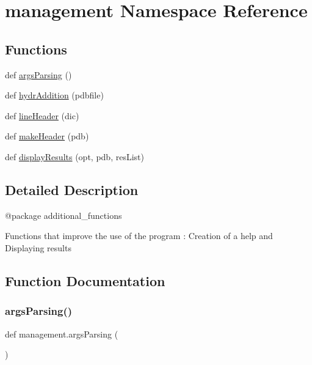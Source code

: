 \hypertarget{namespacemanagement}{}\section{management Namespace Reference}
\label{namespacemanagement}
\subsection*{Functions}
\begin{DoxyCompactItemize}
\item 
def \hyperlink{namespacemanagement_a21eb9ebc249ee7044c7d7b928fa4c848}{args\+Parsing} ()
\item 
def \hyperlink{namespacemanagement_a1b38488abcc92ed2c32b1fa6fd12632d}{hydr\+Addition} (pdbfile)
\item 
def \hyperlink{namespacemanagement_acdaa6894354bf7d216a7b171b7abde78}{line\+Header} (dic)
\item 
def \hyperlink{namespacemanagement_ab684f6dcec493b3604c10971f42a104d}{make\+Header} (pdb)
\item 
def \hyperlink{namespacemanagement_afd826b0a557021cd5bfde6f85b453e8b}{display\+Results} (opt, pdb, res\+List)
\end{DoxyCompactItemize}


\subsection{Detailed Description}
\begin{DoxyVerb}@package additional_functions

Functions that improve the use of the program :
Creation of a help and Displaying results
\end{DoxyVerb}
 

\subsection{Function Documentation}
\mbox{\label{namespacemanagement_a21eb9ebc249ee7044c7d7b928fa4c848}} 
\subsubsection{\texorpdfstring{args\+Parsing()}{argsParsing()}}
{\footnotesize\ttfamily def management.\+args\+Parsing (\begin{DoxyParamCaption}{ }\end{DoxyParamCaption})}

